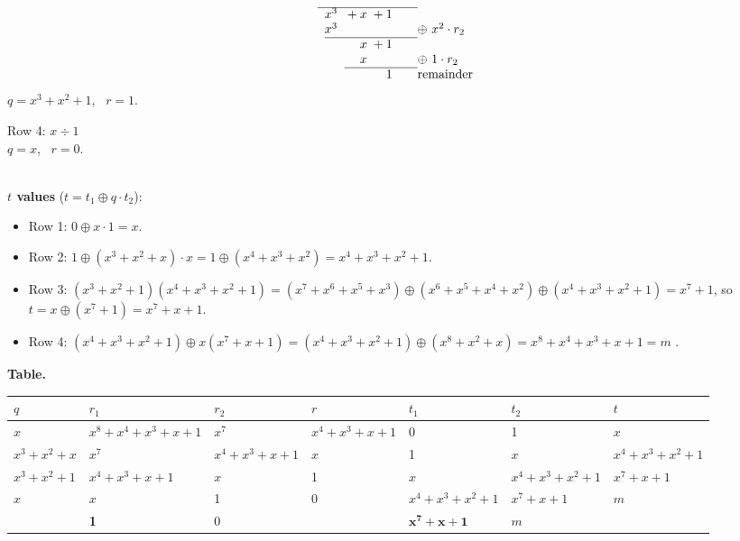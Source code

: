 \begin{worked}
\begin{minipage}[t]{0.5\linewidth}
\[\begin{array}{@{}*{5}{@{\;}r}@{\qquad}l@{}}
\cline{1-5}
 & x^{3} &  & {}+x & {}+1 & \\
 & x^{3} &  &  &  & \oplus\ x^{2}\cdot r_2\\
\cline{2-5}
 &  &  & x & {}+1 & \\
 &  &  & x &  & \oplus\ 1\cdot r_2\\
\cline{4-5}
 &  &  &  & 1  & \text{remainder}\\
\end{array}
\]
$q = x^3 + x^2 + 1$, \ $r = 1$.
\end{minipage}%
\begin{minipage}[t]{0.5\linewidth}
Row 4: $x \div 1$\\[4pt]
$q = x$, \ $r = 0$.
\end{minipage}\\[6pt]
\textbf{$t$ values} ($t = t_1 \oplus q \cdot t_2$):
\begin{itemize}[nosep]
  \item Row 1: $0 \oplus x \cdot 1 = x$.
  \item Row 2: $1 \oplus (x^3 + x^2 + x) \cdot x = 1 \oplus (x^4 + x^3 + x^2) = x^4 + x^3 + x^2 + 1$.
  \item Row 3: $(x^3 + x^2 + 1)(x^4 + x^3 + x^2 + 1) = (x^7 + x^6 + x^5 + x^3) \oplus (x^6 + x^5 + x^4 + x^2) \oplus (x^4 + x^3 + x^2 + 1) = x^7 + 1$, so $t = x \oplus (x^7 + 1) = x^7 + x + 1$.
  \item Row 4: $(x^4 + x^3 + x^2 + 1) \oplus x(x^7 + x + 1) = (x^4 + x^3 + x^2 + 1) \oplus (x^8 + x^2 + x) = x^8 + x^4 + x^3 + x + 1 = m$ \checkmark.
\end{itemize}
\textbf{Table.}
\begin{center}\small\setlength{\tabcolsep}{3pt}
\begin{tabular}{@{}lllllll@{}}
\toprule
$q$ & $r_1$ & $r_2$ & $r$ & $t_1$ & $t_2$ & $t$\\
\midrule
$x$ & $x^8{+}x^4{+}x^3{+}x{+}1$ & $x^7$ & $x^4{+}x^3{+}x{+}1$ & 0 & 1 & $x$\\
$x^3{+}x^2{+}x$ & $x^7$ & $x^4{+}x^3{+}x{+}1$ & $x$ & 1 & $x$ & $x^4{+}x^3{+}x^2{+}1$\\
$x^3{+}x^2{+}1$ & $x^4{+}x^3{+}x{+}1$ & $x$ & 1 & $x$ & $x^4{+}x^3{+}x^2{+}1$ & $x^7{+}x{+}1$\\
$x$ & $x$ & 1 & 0 & $x^4{+}x^3{+}x^2{+}1$ & $x^7{+}x{+}1$ & $m$\\
 & \textbf{1} & 0 & & $\mathbf{x^7{+}x{+}1}$ & $m$ & \\
\bottomrule
\end{tabular}
\end{center}

\end{worked}
